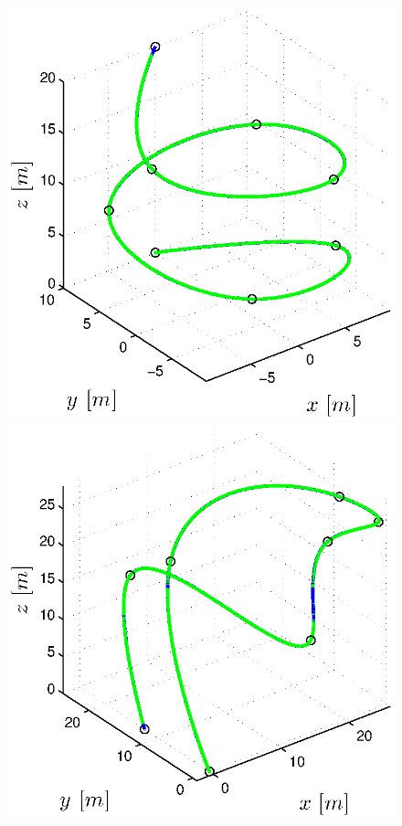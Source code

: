 \begin{figure}[H]
\begin{minipage}[t]{0.32\textwidth}
    \includegraphics[width = \textwidth]{trackings/figure_3D_helix_SplineDegree3_purePursuit_Disturbance_0}
  \end{minipage}
  \hfill
  \begin{minipage}[t]{0.32\textwidth}
    \includegraphics[width = \textwidth]{trackings/figure_3D_agile_SplineDegree3_purePursuit_Disturbance_0}

\end{minipage}
\end{figure}
